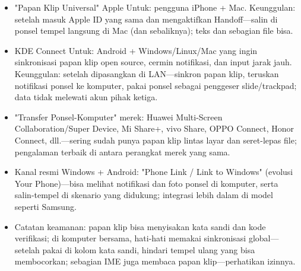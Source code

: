 \begin{itemize}
  \item "Papan Klip Universal" Apple Untuk: pengguna iPhone + Mac. Keunggulan: setelah masuk Apple ID yang sama dan mengaktifkan Handoff—salin di ponsel tempel langsung di Mac (dan sebaliknya); teks dan sebagian file bisa.
  \item KDE Connect Untuk: Android + Windows/Linux/Mac yang ingin sinkronisasi papan klip open source, cermin notifikasi, dan input jarak jauh. Keunggulan: setelah dipasangkan di LAN—sinkron papan klip, teruskan notifikasi ponsel ke komputer, pakai ponsel sebagai penggeser slide/trackpad; data tidak melewati akun pihak ketiga.
  \item "Transfer Ponsel-Komputer" merek: Huawei Multi-Screen Collaboration/Super Device, Mi Share+, vivo Share, OPPO Connect, Honor Connect, dll.—sering sudah punya papan klip lintas layar dan seret-lepas file; pengalaman terbaik di antara perangkat merek yang sama.
  \item Kanal resmi Windows + Android: "Phone Link / Link to Windows" (evolusi Your Phone)—bisa melihat notifikasi dan foto ponsel di komputer, serta salin-tempel di skenario yang didukung; integrasi lebih dalam di model seperti Samsung.
  \item Catatan keamanan: papan klip bisa menyisakan kata sandi dan kode verifikasi; di komputer bersama, hati-hati memakai sinkronisasi global—setelah pakai di kolom kata sandi, hindari tempel ulang yang bisa membocorkan; sebagian IME juga membaca papan klip—perhatikan izinnya.
\end{itemize}


